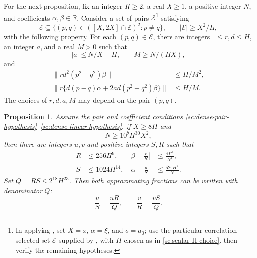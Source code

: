 \documentclass[twoside]{aomart}
\theoremstyle{paperplain}
\newtheorem{proposition}[theorem]{Proposition}
\theoremstyle{paperdefinition}
\numberwithin{equation}{section}
\begin{document}
For the next proposition, fix an integer $H\ge2$, a real $X\ge1$,
a positive integer $N$, and coefficients $\alpha,\beta\in\mathbb R$.
Consider a set of pairs $\mathcal E$\footnote{In applying , set
$X=x$, $\alpha=\xi$, and $a=a_0$; use the particular
correlation-selected set $\mathcal E$ supplied by
, with $H$ chosen as in
\eqref{sc:scalar-H-choice}. 
then verify the remaining hypotheses.}
satisfying
\begin{equation}
 \mathcal E\subseteq
 \{(p,q)\in([X,2X]\cap\mathbb Z)^2:p\ne q\},\qquad
 |\mathcal E|\ge X^2/H,
 \label{sc:dense-pair-hypothesis}
\end{equation}
with the following property. For each $(p,q)\in\mathcal E$, there are
integers $1\le r,d\le H$, an integer $a$, and a real $M>0$ such that
\begin{equation}
 |a|\le N/X+H,\qquad M\ge N/(HX),
 \label{sc:dense-progression-hypothesis}
\end{equation}
and
\begin{align}
 \|r d^2(p^2-q^2)\beta\|&\le H/M^2,
 \label{sc:dense-quadratic-hypothesis}\\
 \|r\{d(p-q)\alpha+2ad(p^2-q^2)\beta\}\|&\le H/M.
 \label{sc:dense-linear-hypothesis}
\end{align}
The choices of $r,d,a,M$ may depend on the pair $(p,q)$.

\begin{proposition}\label{sc:rational-approx}
Assume the pair and coefficient conditions
\eqref{sc:dense-pair-hypothesis}--\eqref{sc:dense-linear-hypothesis}.
If $X\ge8H$ and
\begin{equation*}
 N\ge10^9 H^{30}X^2,
\end{equation*}
then there are integers $u,v$ and positive integers $S,R$ such that
\begin{align*}
 R&\le256H^9,
 &\left|\beta-\frac vR\right|&\le\frac{4H^4}{N^2},
 \\
 S&\le1024H^{14},
 &\left|\alpha-\frac uS\right|&\le\frac{520H^7}{N}.
\end{align*}
Set $Q=RS\le2^{18}H^{23}$. Then both approximating fractions
can be written with denominator $Q$:
\[
 \frac uS=\frac{uR}{Q},\qquad \frac vR=\frac{vS}{Q}.
\]
\end{proposition}
\end{document}
